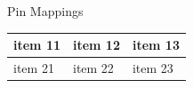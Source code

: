 \documentclass[12pt,letterpaper]{beamer}
\begin{document}
\begin{frame}{Pin Mappings}
    \begin{tabularx}{0.9\textwidth} { 
            | >{\raggedright\arraybackslash}X 
            | >{\centering\arraybackslash}X 
        | >{\raggedleft\arraybackslash}X | }
        \hline
        item 11 & item 12 & item 13 \\
        \hline
        item 21  & item 22  & item 23  \\
        \hline
    \end{tabularx}
\end{frame}
\end{document}
